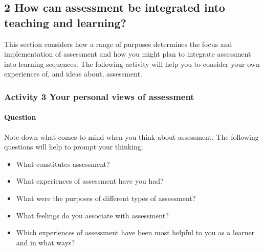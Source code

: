 \documentclass[letterpaper,10pt,english]{sphinxmanual}
\begin{document}
\subsection{2 How can assessment be integrated into teaching and learning?}
\label{\detokenize{content/session_00/Part_00_02:2-How-can-assessment-be-integrated-into-teaching-and-learning?}}\label{\detokenize{content/session_00/Part_00_02::doc}}
This section considers how a range of purposes determines the focus and implementation of assessment and how you might plan to integrate assessment into learning sequences. The following activity will help you to consider your own experiences of, and ideas about, assessment.


\subsubsection{Activity 3 Your personal views of assessment}
\label{\detokenize{content/session_00/Part_00_02:Activity-3-Your-personal-views-of-assessment}}


\paragraph{Question}
\label{\detokenize{content/session_00/Part_00_02:Question}}
Note down what comes to mind when you think about assessment. The following questions will help to prompt your thinking:
\begin{itemize}
\item {} 
What constitutes assessment?

\item {} 
What experiences of assessment have you had?

\item {} 
What were the purposes of different types of assessment?

\item {} 
What feelings do you associate with assessment?

\item {} 
Which experiences of assessment have been most helpful to you as a learner and in what ways?

\end{itemize}
\end{document}
